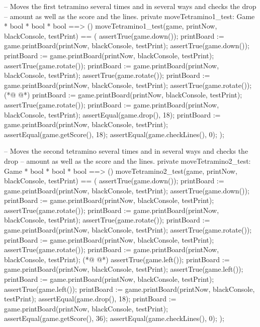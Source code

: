 \begin{vdmpp}[breaklines=true]
  -- Moves the first tetramino several times and in several ways and checks the drop
  -- amount as well as the score and the lines.
  private moveTetramino1_test: Game * bool * bool * bool ==> ()
  moveTetramino1_test(game, printNow, blackConsole, testPrint) == (
   assertTrue(game.down());
   printBoard := game.printBoard(printNow, blackConsole, testPrint);
   assertTrue(game.down());
   printBoard := game.printBoard(printNow, blackConsole, testPrint);
   assertTrue(game.rotate());
   printBoard := game.printBoard(printNow, blackConsole, testPrint);
   assertTrue(game.rotate());
   printBoard := game.printBoard(printNow, blackConsole, testPrint);
   assertTrue(game.rotate());
(*@
\label{moveTetramino2:test:301}
@*)
   printBoard := game.printBoard(printNow, blackConsole, testPrint);
   assertTrue(game.rotate());
   printBoard := game.printBoard(printNow, blackConsole, testPrint);
   assertEqual(game.drop(), 18);
   printBoard := game.printBoard(printNow, blackConsole, testPrint);
   assertEqual(game.getScore(), 18);
   assertEqual(game.checkLines(), 0);
  );
  
  -- Moves the second tetramino several times and in several ways and checks the drop
  -- amount as well as the score and the lines.
  private moveTetramino2_test: Game * bool * bool * bool ==> ()
  moveTetramino2_test(game, printNow, blackConsole, testPrint) == (
   assertTrue(game.down());
   printBoard := game.printBoard(printNow, blackConsole, testPrint);
   assertTrue(game.down());
   printBoard := game.printBoard(printNow, blackConsole, testPrint);
   assertTrue(game.rotate());
   printBoard := game.printBoard(printNow, blackConsole, testPrint);
   assertTrue(game.rotate());
   printBoard := game.printBoard(printNow, blackConsole, testPrint);
   assertTrue(game.rotate());
   printBoard := game.printBoard(printNow, blackConsole, testPrint);
   assertTrue(game.rotate());
   printBoard := game.printBoard(printNow, blackConsole, testPrint);
(*@
\label{moveTetramino3:test:326}
@*)
   assertTrue(game.left());
   printBoard := game.printBoard(printNow, blackConsole, testPrint);
   assertTrue(game.left());
   printBoard := game.printBoard(printNow, blackConsole, testPrint);
   assertTrue(game.left());
   printBoard := game.printBoard(printNow, blackConsole, testPrint);
   assertEqual(game.drop(), 18);
   printBoard := game.printBoard(printNow, blackConsole, testPrint);
   assertEqual(game.getScore(), 36);
   assertEqual(game.checkLines(), 0);
  );
  

\end{vdmpp}
